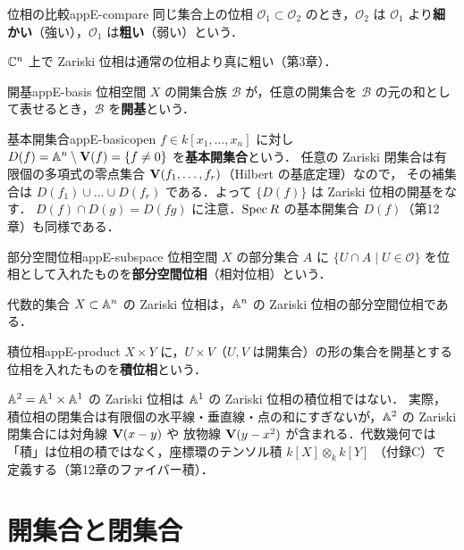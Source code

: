 \begin{mydef}{位相の比較}{appE-compare}
同じ集合上の位相 $\mathcal O_1\subset\mathcal O_2$ のとき，$\mathcal O_2$ は $\mathcal O_1$ より\textbf{細かい}（強い），$\mathcal O_1$ は\textbf{粗い}（弱い）という．
\end{mydef}

$\mathbb{C}^n$ 上で Zariski 位相は通常の位相より真に粗い（第3章）．

\begin{mydef}{開基}{appE-basis}
位相空間 $X$ の開集合族 $\mathcal B$ が，任意の開集合を $\mathcal B$ の元の和として表せるとき，$\mathcal B$ を\textbf{開基}という．
\end{mydef}

\begin{myex}{基本開集合}{appE-basicopen}
$f\in k[x_1,\dots,x_n]$ に対し $D(f)=\mathbb{A}^n\setminus\mathbf{V}(f)=\{f\ne0\}$ を\textbf{基本開集合}という．
任意の Zariski 閉集合は有限個の多項式の零点集合 $\mathbf{V}(f_1,\dots,f_r)$（Hilbert の基底定理）なので，
その補集合は $D(f_1)\cup\dots\cup D(f_r)$ である．よって $\{D(f)\}$ は Zariski 位相の開基をなす．
$D(f)\cap D(g)=D(fg)$ に注意．$\operatorname{Spec} R$ の基本開集合 $D(f)$（第12章）も同様である．
\end{myex}

\begin{mydef}{部分空間位相}{appE-subspace}
位相空間 $X$ の部分集合 $A$ に $\{U\cap A\mid U\in\mathcal O\}$ を位相として入れたものを\textbf{部分空間位相}（相対位相）という．
\end{mydef}

代数的集合 $X\subset\mathbb{A}^n$ の Zariski 位相は，$\mathbb{A}^n$ の Zariski 位相の部分空間位相である．

\begin{mydef}{積位相}{appE-product}
$X\times Y$ に，$U\times V$（$U,V$ は開集合）の形の集合を開基とする位相を入れたものを\textbf{積位相}という．
\end{mydef}

\begin{note}
$\mathbb{A}^2=\mathbb{A}^1\times\mathbb{A}^1$ の Zariski 位相は $\mathbb{A}^1$ の Zariski 位相の積位相ではない．
実際，積位相の閉集合は有限個の水平線・垂直線・点の和にすぎないが，$\mathbb{A}^2$ の Zariski 閉集合には対角線 $\mathbf{V}(x-y)$ や
放物線 $\mathbf{V}(y-x^2)$ が含まれる．代数幾何では「積」は位相の積ではなく，座標環のテンソル積 $k[X]\otimes_kk[Y]$
（付録C）で定義する（第12章のファイバー積）．
\end{note}

\section{開集合と閉集合}

